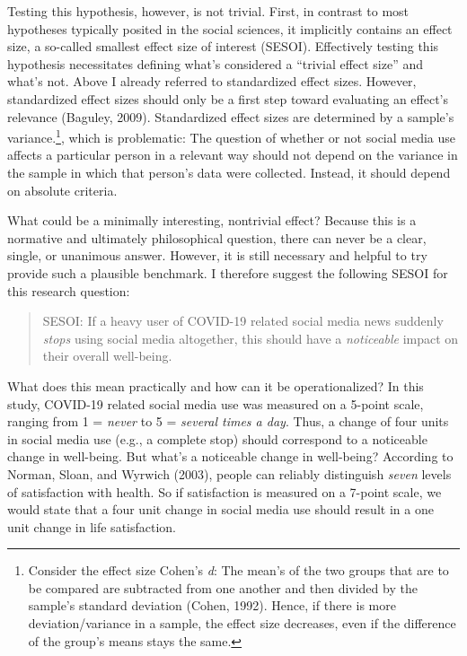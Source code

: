 \documentclass[
  english,
  man,mask,floatsintext]{apa6}
\begin{document}
Testing this hypothesis, however, is not trivial.
First, in contrast to most hypotheses typically posited in the social sciences, it implicitly contains an effect size, a so-called smallest effect size of interest (SESOI).
Effectively testing this hypothesis necessitates defining what's considered a ``trivial effect size'' and what's not.
Above I already referred to standardized effect sizes.
However, standardized effect sizes should only be a first step toward evaluating an effect's relevance (Baguley, 2009).
Standardized effect sizes are determined by a sample's variance.\footnote{Consider the effect size Cohen's \emph{d}: The mean's of the two groups that are to be compared are subtracted from one another and then divided by the sample's standard deviation (Cohen, 1992). Hence, if there is more deviation/variance in a sample, the effect size decreases, even if the difference of the group's means stays the same.}, which is problematic:
The question of whether or not social media use affects a particular person in a relevant way should not depend on the variance in the sample in which that person's data were collected.
Instead, it should depend on absolute criteria.

What could be a minimally interesting, nontrivial effect?
Because this is a normative and ultimately philosophical question, there can never be a clear, single, or unanimous answer.
However, it is still necessary and helpful to try provide such a plausible benchmark.
I therefore suggest the following SESOI for this research question:

\begin{quote}
SESOI: If a heavy user of COVID-19 related social media news suddenly \emph{stops} using social media altogether, this should have a \emph{noticeable} impact on their overall well-being.
\end{quote}

What does this mean practically and how can it be operationalized?
In this study, COVID-19 related social media use was measured on a 5-point scale, ranging from 1 = \emph{never} to 5 = \emph{several times a day}.
Thus, a change of four units in social media use (e.g., a complete stop) should correspond to a noticeable change in well-being.
But what's a noticeable change in well-being?
According to Norman, Sloan, and Wyrwich (2003), people can reliably distinguish \emph{seven} levels of satisfaction with health.
So if satisfaction is measured on a 7-point scale, we would state that a four unit change in social media use should result in a one unit change in life satisfaction.
\end{document}
